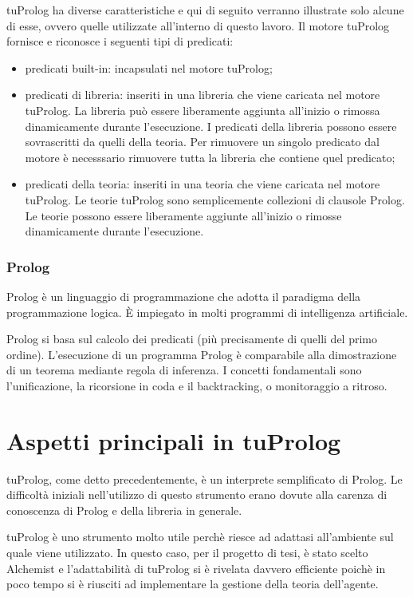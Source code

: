 tuProlog ha diverse caratteristiche e qui di seguito verranno illustrate solo alcune di esse, ovvero quelle utilizzate all'interno di questo lavoro.
Il motore tuProlog fornisce e riconosce i seguenti tipi di predicati:
\begin{itemize}
\item predicati built-in: incapsulati nel motore tuProlog;
\item predicati di libreria: inseriti in una libreria che viene caricata nel motore tuProlog. La libreria può essere liberamente aggiunta all'inizio o rimossa dinamicamente durante l'esecuzione. I predicati della libreria possono essere sovrascritti da quelli della teoria. Per rimuovere un singolo predicato dal motore è necesssario rimuovere tutta la libreria che contiene quel predicato;
\item predicati della teoria: inseriti in una teoria che viene caricata nel motore tuProlog. Le teorie tuProlog sono semplicemente collezioni di clausole Prolog. Le teorie possono essere liberamente aggiunte all'inizio o rimosse dinamicamente durante l'esecuzione.
\end{itemize}

\subsubsection{Prolog}
Prolog è un linguaggio di programmazione che adotta il paradigma della programmazione logica. \`E impiegato in molti programmi di intelligenza artificiale.

Prolog si basa sul calcolo dei predicati (più precisamente di quelli del primo ordine). L'esecuzione di un programma Prolog è comparabile alla dimostrazione di un teorema mediante regola di inferenza. I concetti fondamentali sono l'unificazione, la ricorsione in coda e il backtracking, o monitoraggio a ritroso.

\section{Aspetti principali in tuProlog}
tuProlog, come detto precedentemente, è un interprete semplificato di Prolog.
Le difficoltà iniziali nell'utilizzo di questo strumento erano dovute alla carenza di conoscenza di Prolog e della libreria in generale.

tuProlog è uno strumento molto utile perchè riesce ad adattasi all'ambiente sul quale viene utilizzato. In questo caso, per il progetto di tesi, è stato scelto Alchemist e l'adattabilità di tuProlog si è rivelata davvero efficiente poichè in poco tempo si è riusciti ad implementare la gestione della teoria dell'agente. 

